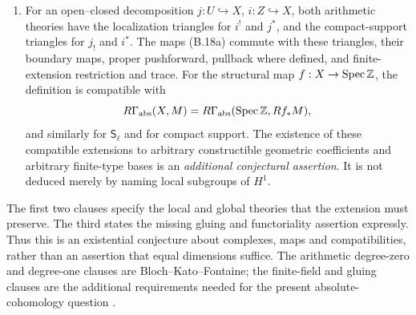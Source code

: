 \begin{definition}
\begin{enumerate}
\(A^1\) is the model-image group of Bloch--Kato, with the
homologically trivial cycle group in its middle-degree case.
The higher rational spaces are the dual completion
\[
 A^2(M)=A^1(M^*)^\vee,\qquad
 A^3(M)=A^0(M^*)^\vee,
\]
and the realization is the Selmer complex (B.16).  Its local
degree-one condition is unramified away from \(\ell\), and
crystalline \(f\) at retained places above \(\ell\).
An arithmetic open uses the geometric \(g\) condition at omitted
places above \(\ell\), and the entire local change complex,
including its degree-two term.  At real places the compact-support
complex includes the stated Tate modification; the rational
archimedean completion is part of the data.
\item For an open--closed decomposition \(j:U\hookrightarrow X\),
\(i:Z\hookrightarrow X\), both arithmetic theories have the
localization triangles for \(i^!\) and \(j^*\), and the
compact-support triangles for \(j_!\) and \(i^*\).
The maps (B.18a) commute with these triangles, their boundary maps,
proper pushforward, pullback where defined, and finite-extension
restriction and trace.  For the structural map \(f:X\to\operatorname{Spec}\mathbb Z\),
the definition is compatible with
\[
 R\Gamma_{\rm abs}(X,M)=
 R\Gamma_{\rm abs}(\operatorname{Spec}\mathbb Z,Rf_*M),
\]
and similarly for \(\mathsf S_\ell\) and for compact support.
The existence of these compatible extensions to arbitrary
constructible geometric coefficients and arbitrary finite-type
bases is an \emph{additional conjectural assertion}.  It is not
deduced merely by naming local subgroups of \(H^1\).
\end{enumerate}
The first two clauses specify the local and global theories that
the extension must preserve.  The third states the missing gluing
and functoriality assertion expressly.  Thus this is an existential
conjecture about complexes, maps and compatibilities, rather than
an assertion that equal dimensions suffice.  The arithmetic
degree-zero and degree-one clauses are Bloch--Kato--Fontaine;
the finite-field and gluing clauses are the additional requirements
needed for the present absolute-cohomology question
\cite[Conjecture~5.3]{BBlochKato1990}
\cite[\S\S6.5--6.7]{BFontaine1992}
\cite[Conjecture~8.3 and Theorem~8.4]{BGeisser2004}.
\end{definition}

